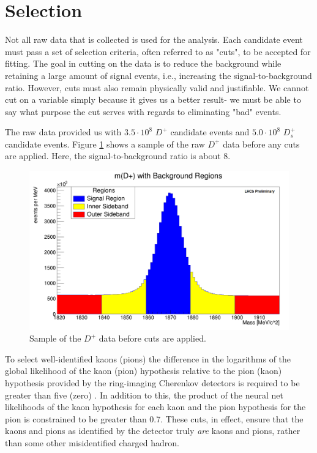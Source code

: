 \documentclass[12pt, letterpaper]{article}
\begin{document}
\section{Selection}
Not all raw data that is collected is used for the analysis. Each candidate event must pass a set of selection criteria, often referred to as "cuts", to be accepted for fitting. The goal in cutting on the data is to reduce the background while retaining a large amount of signal events, i.e., increasing the signal-to-background ratio. However, cuts must also remain physically valid and justifiable. We cannot cut on a variable simply because it gives us a better result- we must be able to say what purpose the cut serves with regards to eliminating "bad" events.

The raw data provided us with $3.5 \cdot 10^8$ $D^+$ candidate events and $5.0 \cdot 10^8$ $D^+_s$ candidate events. Figure \ref{fig:precut} shows a sample of the raw $D^+$ data before any cuts are applied. Here, the signal-to-background ratio is about 8. 

\begin{figure}[h!]
\centering
\includegraphics[width=0.7\linewidth]{dp_mdp.png}
\caption{Sample of the $D^+$ data before cuts are applied.}
\label{fig:precut}
\end{figure}

\newpage
To select well-identified kaons (pions) the difference in the logarithms of the global likelihood of the kaon (pion) hypothesis relative to the pion (kaon) hypothesis provided by the ring-imaging Cherenkov detectors is required to be greater than five (zero) \cite{lhcb}. In addition to this, the product of the neural net likelihoods of the kaon hypothesis for each kaon and the pion hypothesis for the pion is constrained to be greater than 0.7. These cuts, in effect, ensure that the kaons and pions as identified by the detector truly \textit{are} kaons and pions, rather than some other misidentified charged hadron.
\end{document}
